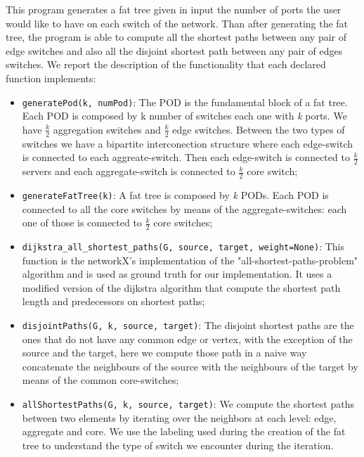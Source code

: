 \documentclass[10pt,a4paper]{article}
\begin{document}
This program generates a fat tree given in input the number of ports the user would like to have on each switch of the network. Than after generating the fat tree, the program is able to compute all the shortest paths between any pair of edge switches and also all the disjoint shortest path between any pair of edges switches.
We report the description of the functionality that each declared function implements: 
\begin{itemize}


\item{\texttt{generatePod(k, numPod)}: 
The POD is the fundamental block of a fat tree. Each POD is composed by k number of switches each one with \emph{k} ports. We have $\frac{k}{2}$ aggregation switches and $\frac{k}{2}$ edge switches. Between the two types of switches we have a bipartite interconection structure where each edge-switch is connected to each aggreate-switch. Then each edge-switch is connected to $\frac{k}{2}$ servers and each aggregate-switch is connected to $\frac{k}{2}$ core switch;}

\item{\texttt{generateFatTree(k)}:
A fat tree is composed by \emph{k} PODs. Each POD is connected to all the core switches by
means of the aggregate-switches: each one of those is connected to $\frac{k}{2}$ core switches;}

\item{\texttt{dijkstra\_all\_shortest\_paths(G, source, target, weight=None)}:
This function is the networkX's implementation of the "all-shortest-paths-problem" algorithm and is used as ground truth for our implementation. It uses a modified version of the dijkstra algorithm that compute  the shortest path length and predecessors on shortest paths;}

\item{\texttt{disjointPaths(G, k, source, target)}:
The disjoint shortest paths are the ones that do not have any common edge or vertex,
with the exception of the source and the target, here we compute those path in a naive
way concatenate the neighbours of the source with the neighbours of the target by means of the common core-switches;}

\item{\texttt{allShortestPaths(G, k, source, target)}:
We compute the shortest paths between two elements by iterating over the neighbors at each level: edge, aggregate and core. We use the labeling used during the creation of the fat tree to understand the type of switch we encounter during the iteration.}

\end{itemize}
\end{document}
